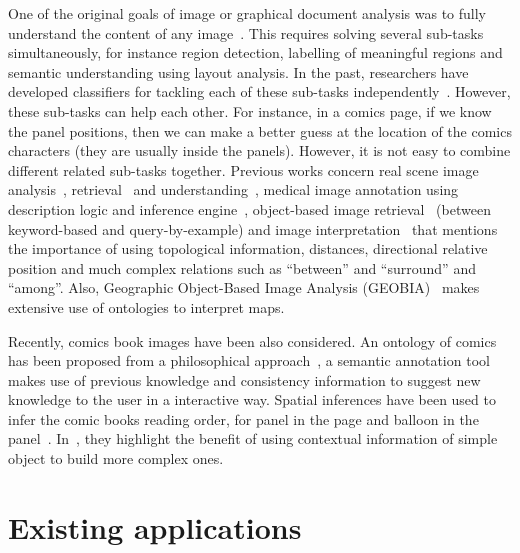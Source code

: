 One of the original goals of image or graphical document analysis was to fully understand the content of any image~\cite{Lamiroy2014Handbook}.
This requires solving several sub-tasks simultaneously, for instance region detection, labelling of meaningful regions and semantic understanding using layout analysis.
In the past, researchers have developed classifiers for tackling each of these sub-tasks independently~\cite{Mao2003Document}.
However, these sub-tasks can help each other.
For instance, in a comics page, if we know the panel positions, then we can make a better guess at the location of the comics characters (they are usually inside the panels).
However, it is not easy to combine different related sub-tasks together.
Previous works concern real scene image analysis~\cite{Blaschke2014Geographic}, retrieval~\cite{Sciascio2011Structured} and understanding~\cite{Li2012Toward,Fidler2012Describing}, medical image annotation using description logic and inference engine~\cite{Hu2003Ontology}, object-based image retrieval~\cite{Mezaris03anontology,Sarwar2013Ontology} (between keyword-based and query-by-example) and image interpretation~\cite{Hudelot2008Fuzzy,Ogier2000Semantic} that mentions the importance of using topological information, distances, directional relative position and much complex relations such as ``between'' and ``surround'' and ``among''.
Also, Geographic Object-Based Image Analysis (GEOBIA)~\cite{Blaschke2014Geographic} makes extensive use of ontologies to interpret maps.


Recently, comics book images have been also considered.
An ontology of comics has been proposed from a philosophical approach~\cite{Aaron2011}, a semantic annotation tool~\cite{Hermann2012Guided} makes use of previous knowledge and consistency information to suggest new knowledge to the user in a interactive way.
Spatial inferences have been used to infer the comic books reading order, for panel in the page and balloon in the panel~\cite{Guerin2012Ontologies}. 
In~\cite{Sciascio2011Structured}, they highlight the benefit of using contextual information of simple object to build more complex ones.


\section{Existing applications}
\label{sec:sota:applications}

